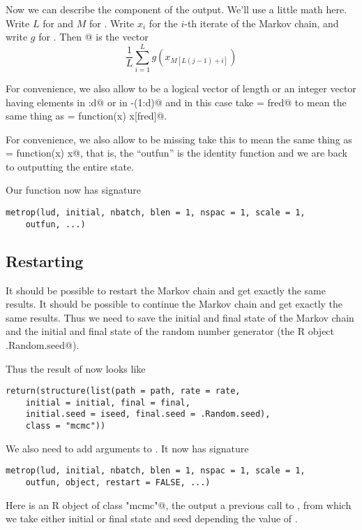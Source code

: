 \documentclass{article}
\begin{document}
Now we can describe the \verb@path@ component of the output.
We'll use a little math here.  Write $L$ for \verb@blen@ and
$M$ for \verb@nspac@.  Write $x_i$ for the $i$-th iterate of the
Markov chain, and write $g$ for \verb@outfun@.  Then \verb@path[@$j$\verb@, ]@
is the vector
$$
   \frac{1}{L} \sum_{i = 1}^L g(x_{M [L (j - 1) + i]})
$$

For convenience, we also allow \verb@outfun@ to be a logical vector of
length \verb@d@ or an integer vector having elements in :d@
or in \verb@-(1:d)@ and in this case take \verb@outfun = fred@
to mean the same thing as \verb@outfun = function(x) x[fred]@.

For convenience, we also allow \verb@outfun@ to be missing
take this to mean the same thing as \verb@outfun = function(x) x@,
that is, the ``outfun'' is the identity function and we are back
to outputting the entire state.

Our function now has signature
\begin{verbatim}
metrop(lud, initial, nbatch, blen = 1, nspac = 1, scale = 1,
    outfun, ...)
\end{verbatim}

\subsection{Restarting}

It should be possible to restart the Markov chain and get exactly the
same results.  It should be possible to continue the Markov chain and
get exactly the same results.  Thus we need to save the initial and
final state of the Markov chain
and the initial and final state of the random number generator
(the R object \verb@.Random.seed@).

Thus the result of \verb@metrop@ now looks like
\begin{verbatim}
return(structure(list(path = path, rate = rate,
    initial = initial, final = final,
    initial.seed = iseed, final.seed = .Random.seed),
    class = "mcmc"))
\end{verbatim}

We also need to add arguments to \verb@metrop@.  It now has signature
\begin{verbatim}
metrop(lud, initial, nbatch, blen = 1, nspac = 1, scale = 1,
    outfun, object, restart = FALSE, ...)
\end{verbatim}
Here \verb@object@ is an R object of class \verb@"mcmc"@, the output
a previous call to \verb@metrop@, from which we take either initial
or final state and seed depending the value of \verb@restart@.
\end{document}
